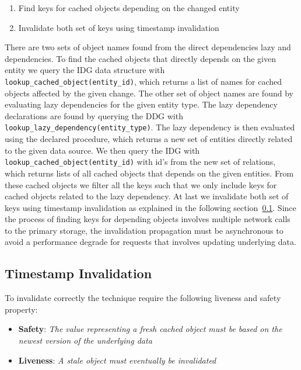 \begin{enumerate}
  \item Find keys for cached objects depending on the changed entity
  \item Invalidate both set of keys using timestamp invalidation
\end{enumerate}

There are two sets of object names found from the direct dependencies lazy and dependencies. To find the cached objects that directly depends on the given entity we query the IDG data structure with \verb$lookup_cached_object(entity_id)$, which returns a list of names for cached objects affected by the given change. The other set of object names are found by evaluating lazy dependencies for the given entity type.
The lazy dependency declarations are found by querying the DDG with \verb$lookup_lazy_dependency(entity_type)$. The lazy dependency is then evaluated using the declared procedure, which returns a new set of entities directly related to the given data source. We then query the IDG with \verb$lookup_cached_object(entity_id)$ with id's from the new set of relations, which returns lists of all cached objects that depends on the given entities. From these cached objects we filter all the keys such that we only include keys for cached objects related to the lazy dependency.
At last we invalidate both set of keys using timestamp invalidation as explained in the following section~\ref{subsec:timestamp-invalidation}.
Since the process of finding keys for depending objects involves multiple network calls to the primary storage, the invalidation propagation must be asynchronous to avoid a performance degrade for requests that involves updating underlying data.


\subsection{Timestamp Invalidation}
\label{subsec:timestamp-invalidation}

To invalidate correctly the technique require the following liveness and safety property:

\begin{itemize}
  \item \textbf{Safety}: \emph{The value representing a fresh cached object must be based on the newest version of the underlying data}
  \item \textbf{Liveness}: \emph{A stale object must eventually be invalidated}
\end{itemize}

